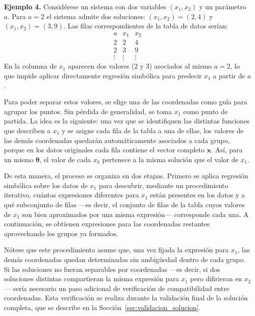 \documentclass[12pt,a4paper]{article} \usepackage[utf8]{inputenc} \usepackage[spanish]{babel} \usepackage{amsmath, amssymb, amsthm} \usepackage{bm} \usepackage{float} \usepackage{longtable} \usepackage[hidelinks]{hyperref}
\newcommand{\xvec}{\mathbf{x}} \newcommand{\thetavec}{\boldsymbol{\theta}} \newcommand{\Fvec}{\mathbf{F}} \newcommand{\R}{\mathbb{R}} \newcommand{\norm}[1]{\left\lVert#1\right\rVert} \newcommand{\loss}{\mathcal{L}} \newcommand{\dataset}{\mathcal{D}} \newcommand{\jac}{\mathbf{J}}
\begin{document}
\bigskip
\noindent\textbf{Ejemplo 4.} Considérese un sistema con dos variables
\((x_1, x_2)\) y un parámetro \(a\). Para \(a = 2\) el sistema admite
dos soluciones: \((x_1, x_2) = (2, 4)\) y \((x_1, x_2) = (3, 9)\). Las
filas correspondientes de la tabla de datos serían:
\[
\begin{array}{c|c|c}
a & x_1 & x_2 \\
\hline
2 & 2 & 4 \\
2 & 3 & 9 \\
\vdots & \vdots & \vdots
\end{array}
\]
En la columna de \(x_1\) aparecen dos valores (\(2\) y \(3\)) asociados
al mismo \(a = 2\), lo que impide aplicar directamente regresión
simbólica para predecir \(x_1\) a partir de \(a\).

Para poder separar estos valores, se elige una de las coordenadas como
guía para agrupar los puntos. Sin pérdida de generalidad, se toma
\(x_1\) como punto de partida. La idea es la siguiente: una vez que se
identifiquen las distintas funciones que describen a \(x_1\) y se asigne
cada fila de la tabla a una de ellas, los valores de las demás
coordenadas quedarán automáticamente asociados a cada grupo, porque en
los datos originales cada fila contiene el vector completo \(\xvec\).
Así, para un mismo \(\thetavec\), el valor de cada \(x_k\) pertenece a
la misma solución que el valor de \(x_1\).

De esta manera, el proceso se organiza en dos etapas. Primero se aplica
regresión simbólica sobre los datos de \(x_1\) para descubrir, mediante
un procedimiento iterativo, cuántas expresiones diferentes para \(x_1\)
están presentes en los datos y a qué subconjunto de filas —es decir, el
conjunto de filas de la tabla cuyos valores de \(x_1\) son bien
aproximados por una misma expresión— corresponde cada una. A
continuación, se obtienen expresiones para las coordenadas restantes
aprovechando los grupos ya formados.

Nótese que este procedimiento asume que, una vez fijada la expresión
para \(x_1\), las demás coordenadas quedan determinadas sin ambigüedad
dentro de cada grupo. Si las soluciones no fueran separables por
coordenadas —es decir, si dos soluciones distintas compartieran la
misma expresión para \(x_1\) pero difirieran en \(x_2\)— sería necesario
un paso adicional de verificación de compatibilidad entre coordenadas.
Esta verificación se realiza durante la validación final de la solución
completa, que se describe en la Sección~\ref{sec:validacion_solucion}.
\end{document}
